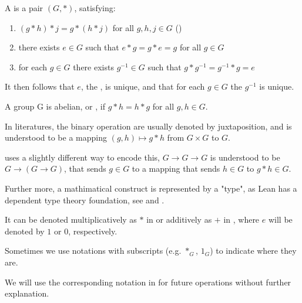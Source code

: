 \begin{definition}[Group]
    \label{Group}
    \leanok

    A  is a pair $(G, *)$, satisfying:

    \begin{enumerate}
    \item $(g * h) * j = g * (h * j)$ for all $g, h, j \in G$ ()
    \item there exists $e \in G$ such that $e * g = g * e = g$ for all $g \in G$
    \item for each $g \in G$ there exists $g^{-1} \in G$ such that $g * g^{-1} = g^{-1} * g = e$

    \end{enumerate}

\end{definition}

\begin{remark}
    \label{mk:Group}
    
    It then follows that $e$, the , is unique, and that for each $g \in G$ the  $g^{-1}$ is unique.

    A group G is abelian, or , if $g * h = h * g$ for all $g, h \in G$.

\end{remark}

\begin{remark}
    \label{mk:Notation}

    In literatures, the binary operation are usually denoted by juxtaposition, and is understood to be a mapping
    $(g, h) \mapsto g * h$ from $G \times G$ to $G$.
    
    \Mathlib uses a slightly different way to encode this, $G \to G \to G$ is understood to be $G \to (G \to G)$,
    that sends $g \in G$ to a mapping that sends $h \in G$ to $g * h \in G$.
    
    Further more, a mathimatical construct is represented by a "type", as Lean has a dependent type theory foundation,
    see \cite{carneiro2019type} and \cite[section 3.2]{ullrich2023extensible}.
    
    It can be denoted multiplicatively as $*$ in 
    or additively as $+$ in , where $e$ will be denoted by $1$ or $0$, respectively.

    Sometimes we use notations with subscripts (e.g. $*_G$, $1_G$) to indicate where they are.

    We will use the corresponding notation in \Mathlib for future operations without further explanation.

\end{remark}

